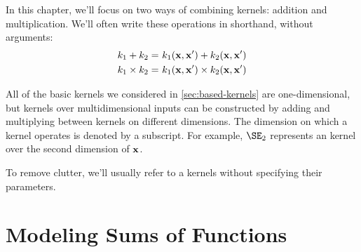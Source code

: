 In this chapter, we'll focus on two ways of combining kernels: addition and multiplication.
We'll often write these operations in shorthand, without arguments:
%
\begin{align}
k_1 + k_2 =& \,\, k_1({\bf{x}}, {\bf{x}}') + k_2( {\bf{x}}, {\bf{x}}')\\
k_1 \times k_2 =& \,\, k_1({\bf{x}}, {\bf{x}}') \times k_2({\bf{x}}, {\bf{x}}')
\end{align}

All of the basic kernels we considered in \cref{sec:based-kernels} are one-dimensional, but kernels over multidimensional inputs can be constructed by adding and multiplying between kernels on different dimensions.
The dimension on which a kernel operates is denoted by a subscript.
For example, $\SE_2$ represents an \kSE{} kernel over the second dimension of ${\bf{x}}$.

To remove clutter, we'll usually refer to a kernels without specifying their parameters.



\section{Modeling Sums of Functions}

